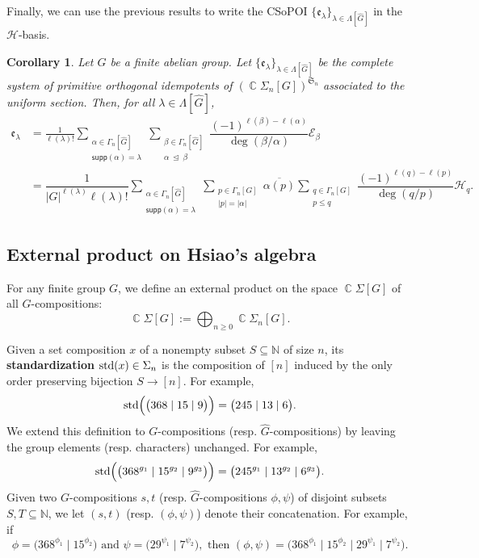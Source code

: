 \documentclass[11pt, oneside, reqno]{amsart}
\newtheorem{cor}[theorem]{Corollary}
\theoremstyle{definition}
\numberwithin{equation}{section}
\DeclareMathOperator{\C}{\mathbb{C}}
\newcommand{\defn}[1]{{\color{RoyalBlue}\bf#1}}
\def \cE{{\mathcal{E}}}
\def \kk{\C}
\def \ol{\overline}
\def \sym{\mathfrak{S}}
\def \ee{{\mathfrak{e}}}
\def \wh{\widehat}
\def \gsetcomposition{{\Sigma_n[G]}}
\def \hsiao {{\gsetcomposition}}
\DeclareMathOperator{\chleq}{\unlhd}
\def \supp{\mathsf{supp}}
\newcommand{\SB}[1]{\mathcal{#1}} 		%
\newcommand{\abs}[1]{|{#1}|} 				%
\begin{document}
Finally, we can use the previous results to write the CSoPOI $\{ \ee_\lambda \}_{\lambda \in \Lambda[\wh{G}]} $ in the $\SB{H}$-basis.

\begin{cor}\label{cor:uniform-CSoPOI-Hsiao}
    Let $G$ be a finite abelian group. Let $\{\ee_\lambda\}_{\lambda \in \Lambda[\wh{G}]}$ be the complete system of primitive orthogonal idempotents of $(\kk \hsiao)^{\sym_n}$ associated to the uniform section.
    Then, for all $\lambda \in \Lambda[\wh{G}]$,
    \begin{align*}
        \ee_\lambda &= \frac{1}{\ell(\lambda)!} \sum_{\substack{ \alpha \in \Gamma_n[\wh{G}] \\ \supp(\alpha) = \lambda}} \sum_{\substack{\beta \in \Gamma_n[\wh{G}] \\ \alpha \ \chleq \ \beta}} \dfrac{(-1)^{\ell(\beta)-\ell(\alpha)}}{\deg(\beta/\alpha)} \cE_\beta\\
        &=\dfrac{1}{|G|^{\ell(\lambda)} \ell(\lambda)!} \sum_{\substack{ \alpha \in \Gamma_n[\wh{G}] \\ \supp(\alpha) = \lambda}} \sum_{\substack{p \in \Gamma_n[G] \\ \abs{p} = \abs{\alpha} }} \ol{\alpha(p)} \sum_{\substack{q \in \Gamma_n[G] \\ p \leq q }} \dfrac{(-1)^{\ell(q)-\ell(p)}}{\deg(q/p)} \SB{H}_q.
    \end{align*}
\end{cor}


\subsection{External product on Hsiao's algebra}\label{sec:externalproductonHsiao}

For any finite group $G$, we define an external product on the space $\kk\Sigma[G]$ of all $G$-compositions:
\[
    \kk\Sigma[G] := \bigoplus_{n \geq 0} \kk\Sigma_n[G].
\]

Given a set composition $x$ of a nonempty subset $S \subseteq \mathbb{N}$ of size $n$, its \defn{standardization} ${\rm std}(x) \in \Sigma_n$ is the composition of $[n]$ induced by the only order preserving bijection $S \to [n]$. For example,
\[
    {\rm std}\Big( \big( 368 \mid 15 \mid 9 \big) \Big) = \big( 245 \mid 13 \mid 6\big).
\]
We extend this definition to $G$-compositions (resp. $\wh{G}$-compositions) by leaving the group elements (resp. characters) unchanged.
For example,
\[
    {\rm std}\Big( \big( 368^{g_1} \mid 15^{g_2} \mid 9^{g_3} \big) \Big) = \big( 245^{g_1} \mid 13^{g_2} \mid 6^{g_3} \big).
\]
Given two $G$-compositions $s,t$ (resp. $\wh{G}$-compositions $\phi,\psi$) of disjoint subsets $S,T \subseteq \mathbb{N}$, we let $(s,t)$ (resp. $(\phi,\psi)$) denote their concatenation.
For example, if
\[
    \phi = \big( 368^{\phi_1} \mid 15^{\phi_2} \big)
    \text{~and~}
    \psi = \big( 29^{\psi_1} \mid 7^{\psi_2} \big),
    \text{~then~}
    (\phi,\psi) = \big( 368^{\phi_1} \mid 15^{\phi_2} \mid 29^{\psi_1} \mid 7^{\psi_2} \big).
\]
\end{document}
